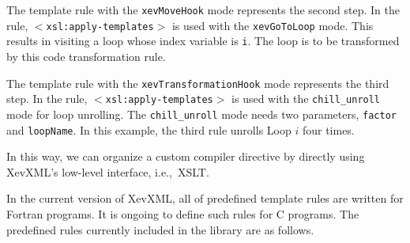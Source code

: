 The template rule with the \texttt{xevMoveHook} mode represents the
second step. In the rule, \texttt{$<$xsl:apply-templates$>$} is used
with the \texttt{xevGoToLoop} mode. This results in visiting a loop
whose index variable is \texttt{i}. The loop is to be transformed by
this code transformation rule.

The template rule with the \texttt{xevTransformationHook} mode
represents the third step. In the rule,
\texttt{$<$xsl:apply-templates$>$} is used with the
\texttt{chill\_unroll} mode for loop unrolling. The
\texttt{chill\_unroll} mode needs two parameters, \texttt{factor} and
\texttt{loopName}. In this example, the third rule unrolls Loop $i$ four
times.

In this way, we can organize a custom compiler directive by directly
using XevXML's low-level interface, i.e.,~XSLT.

In the current version of XevXML, all of predefined template rules are
written for Fortran programs. It is ongoing to define such rules for C
programs.  The predefined rules currently included in the library are as
follows.

